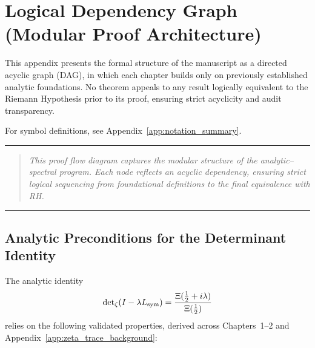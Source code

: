 \section{Logical Dependency Graph (Modular Proof Architecture)}
\label{app:dependency_graph}

This appendix presents the formal structure of the manuscript as a directed acyclic graph (DAG), in which each chapter builds only on previously established analytic foundations. No theorem appeals to any result logically equivalent to the Riemann Hypothesis prior to its proof, ensuring strict acyclicity and audit transparency.

For symbol definitions, see Appendix~\ref{app:notation_summary}.

\vspace{1ex}
\hrule
\vspace{1ex}

\begin{quote}
\textit{This proof flow diagram captures the modular structure of the analytic–spectral program. Each node reflects an acyclic dependency, ensuring strict logical sequencing from foundational definitions to the final equivalence with RH.}
\end{quote}

\vspace{1ex}
\hrule
\vspace{2ex}

\subsection*{Analytic Preconditions for the Determinant Identity}
\label{dag:determinant_preconditions}

The analytic identity
\[
\det\nolimits_\zeta(I - \lambda L_{\mathrm{sym}}) = \frac{\Xi(\tfrac{1}{2} + i\lambda)}{\Xi(\tfrac{1}{2})}
\]
relies on the following validated properties, derived across Chapters~1–2 and Appendix~\ref{app:zeta_trace_background}:

